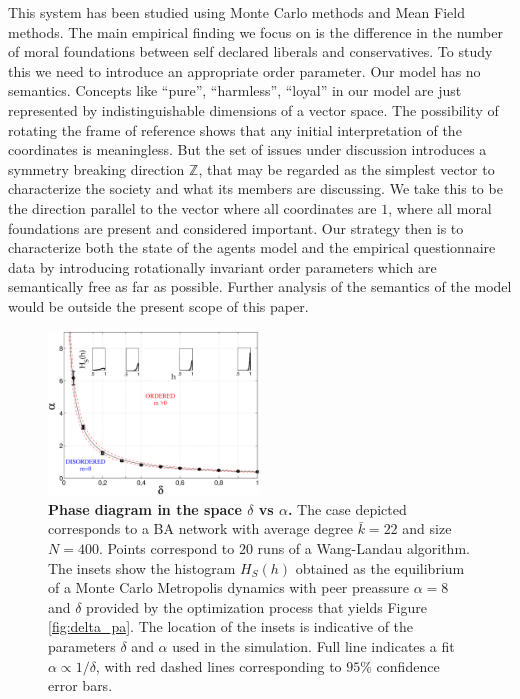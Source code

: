 \documentclass[twocolumn,showpacs]{revtex4-1}
\begin{document}
This system has been studied  using Monte Carlo methods and 
Mean Field methods. The main empirical finding we focus on is the difference  in the number 
of moral foundations between self declared liberals and
conservatives. To study this we 
need to introduce an appropriate order parameter. 
 Our model has no semantics. Concepts like ``pure'', ``harmless'', ``loyal''
 in our model are just represented by indistinguishable dimensions of a vector space.
The  possibility of rotating  the frame of reference shows that any
initial interpretation  
of the coordinates is meaningless. But the set of issues under discussion 
introduces a symmetry breaking direction $\mathbb{Z}$, that may be regarded as 
the simplest vector to  characterize the society and what its
members are discussing.
We take this to be the direction parallel to the vector where all
coordinates are $1$, where all moral foundations are present and 
considered important. Our strategy then is to 
characterize both  the state of the agents model and 
 the empirical questionnaire
data  by introducing rotationally invariant order parameters 
which are semantically free as far as possible. 
Further analysis of the semantics of the model would 
be outside the present scope of this paper.


\begin{figure}[h]
\centering \includegraphics[width=0.5\textwidth]{fig5_phase_diag.eps}
\centering\caption{ {\bf Phase diagram in the space $\delta$ vs $\alpha$.} 
The case depicted corresponds to a BA network with average degree $\bar{k}=22$ and size $N=400$. Points correspond to $20$ runs of a Wang-Landau algorithm. The insets show the histogram $H_S(h)$ obtained as the equilibrium of a
Monte Carlo Metropolis dynamics with peer preassure $\alpha=8$ and $\delta$ provided by the optimization process that yields Figure \ref{fig:delta_pa}. The location of the insets is indicative 
of the parameters  $\delta$ and $\alpha$ used in the simulation. Full line indicates a fit $\alpha\propto1/\delta$, with red dashed lines corresponding to $95\%$ confidence error bars.
 }\label{fig:diagramadefase} 
\end{figure}
\end{document}
